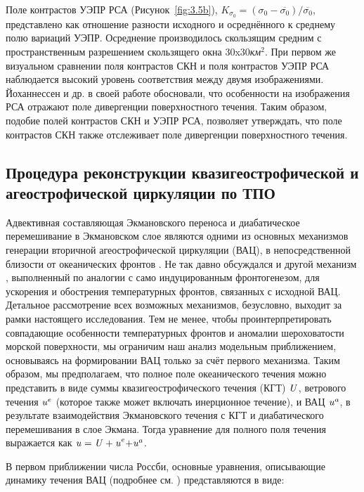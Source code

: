 Поле контрастов УЭПР РСА (Рисунок~\ref{fig:3.5b}), $K_{\sigma _{0} } =(\sigma _{0} -\overline{\sigma _{0} })/\overline{\sigma _{0} }$, представлено как отношение разности исходного и осреднённого к среднему полю вариаций УЭПР. Осреднение производилось скользящим средним с пространственным разрешением скользящего окна 30x30\textit{км${}^2$}. При первом же визуальном сравнении поля контрастов СКН и поля контрастов УЭПР РСА наблюдается высокий уровень соответствия между двумя изображениями. Йоханнессен и др. в своей работе обосновали, что особенности на изображения РСА отражают поле дивергенции поверхностного течения. Таким образом, подобие полей контрастов СКН и УЭПР РСА, позволяет утверждать, что поле контрастов СКН также отслеживает поле дивергенции поверхностного течения.



\subsection{Процедура реконструкции квазигеострофической и агеострофической циркуляции по ТПО} \label{sec:3.2.2}


Адвективная составляющая Экмановского переноса и диабатическое перемешивание в Экмановском слое являются одними из основных механизмов генерации вторичной агеострофической циркуляции (ВАЦ), в непосредственной близости от океанических фронтов \citep{Klein1990,Garrett1981,Thompson2000,Nagai2006}. Не так давно обсуждался и другой механизм \citep{McWilliams2009}, выполненный по аналогии с само индуцированным фронтогенезом, для ускорения и обострения температурных фронтов, связанных с исходной ВАЦ. Детальное рассмотрение всех возможных механизмов, безусловно, выходит за рамки настоящего исследования. Тем не менее, чтобы проинтерпретировать совпадающие особенности температурных фронтов и аномалии шероховатости морской поверхности, мы ограничим наш анализ модельным приближением, основываясь на формировании ВАЦ только за счёт первого механизма. Таким образом, мы предполагаем, что полное поле океанического течения можно представить в виде суммы квазигеострофического течения (КГТ) ${\it U}$, ветрового течения ${\it u}^{e} $ (которое также может включать инерционное течение), и ВАЦ ${\it u}^{a} $, в результате взаимодействия Экмановского течения с КГТ и диабатического перемешивания в слое Экмана. Тогда уравнение для полного поля течения выражается как ${\it u=U+u}^{e} {\it +u}^{a} $.

В первом приближении числа Россби, основные уравнения, описывающие динамику течения ВАЦ (подробнее см. \citep{Klein1990,Garrett1981,Thompson2000,Nagai2006}) представляются в виде:



